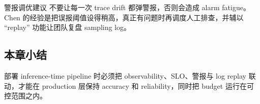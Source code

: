 \begin{warningbox}{警报调优建议}
不要让每一次 trace drift 都弹警报，否则会造成 alarm fatigue。Chen 的经验是把误报阈值设得稍高，真正有问题时再调度人工排查，并辅以 “replay” 功能让团队复盘 sampling log。
\end{warningbox}

\subsection{本章小结}
部署 inference-time pipeline 时必须把 observability、SLO、警报与 log replay 联动，才能在 production 层保持 accuracy 和 reliability，同时把 budget 运行在可控范围之内。

